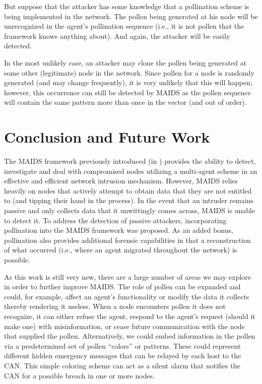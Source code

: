\documentclass{acm_proc_article-sp}
\begin{document}
But suppose that the attacker has some knowledge that a pollination scheme is being implemented in the network.  The pollen being generated at his node will be unrecognized in the agent's pollination sequence (i.e., it is not pollen that the framework knows anything about).  And again, the attacker will be easily detected.

In the most unlikely case, an attacker may clone the pollen being generated at some other (legitimate) node in the network.  Since pollen for a node is randomly generated (and may change frequently), it is very unlikely that this will happen; however, this occurrence can still be detected by MAIDS as the pollen sequence will contain the same pattern more than once in the vector (and out of order).

\section{Conclusion and Future Work}
The MAIDS framework previously introduced (in \cite{kackley09}) provides the ability to detect, investigate and deal with compromised nodes utilizing a multi-agent scheme in an effective and efficient network intrusion mechanism.  However, MAIDS relies heavily on nodes that actively attempt to obtain data that they are not entitled to (and tipping their hand in the process).  In the event that an intruder remains passive and only collects data that it unwittingly comes across, MAIDS is unable to detect it.  To address the detection of passive attackers, incorporating pollination into the MAIDS framework was proposed.  As an added bonus, pollination also provides additional forensic capabilities in that a reconstruction of what occurred (i.e., where an agent migrated throughout the network) is possible.

As this work is still very new, there are a large number of areas we may explore in order to further improve MAIDS.  The role of pollen can be expanded and could, for example, affect an agent's functionality or modify the data it collects thereby rendering it useless.  When a node encounters pollen it does not recognize, it can either refuse the agent, respond to the agent's request (should it make one) with misinformation, or cease future communication with the node that supplied the pollen.  Alternatively, we could embed information in the pollen via a predetermined set of pollen ``colors'' or patterns.  These could represent different hidden emergency messages that can be relayed by each host to the CAN.  This simple coloring scheme can act as a silent alarm that notifies the CAN for a possible breach in one or more nodes.
\end{document}
